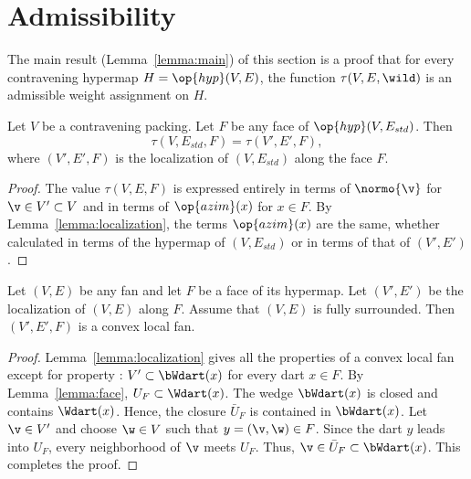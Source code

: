 \section{Admissibility}




The main result (Lemma~\ref{lemma:main}) of this section is a proof
that for every contravening hypermap $H=\op{hyp}(V,E)$, the function
$\tau(V,E,\wild)$ is an admissible weight assignment on $H$.



\begin{lemma}[]\cutrate{}  \label{lemma:tau-local}
  Let $V$ be a contravening packing.
  Let $F$ be any face of $\op{hyp}(V,E_{std})$.  Then
\[ 
\tau(V,E_{std},F) = \tau(V',E',F),
\] 
where $(V',E',F)$ is the localization of $(V,E_{std})$ along the face $F$.
\end{lemma}

\begin{proof} The value $\tau(V,E,F)$ is expressed entirely in terms
  of $\normo{\v}$ for $\v\in V'\subset V$ and in terms of
  $\op{azim}(x)$ for $x\in F$.  By Lemma~\ref{lemma:localization},
  the terms $\op{azim}(x)$ are the same, whether calculated in terms
  of the hypermap of $(V,E_{std})$ or in terms of that of $(V',E')$.
\end{proof}


\begin{lemma}[]\cutrate{} Let $(V,E)$ be any fan and
  let $F$ be a face of its hypermap.  Let $(V',E')$ be the
  localization of $(V,E)$ along $F$.  Assume that $(V,E)$ is fully surrounded.
  Then $(V',E',F)$ is a convex local fan.
\end{lemma}

\begin{proof}
  Lemma~\ref{lemma:localization} gives all the properties of a convex local fan except for property : $V'\subset \bWdart(x)$ for
  every dart $x\in F$.  By Lemma~\ref{lemma:face}, $U_F \subset
  \Wdart(x)$.  The wedge $\bWdart(x)$ is closed and contains
  $\Wdart(x)$. Hence, the closure $\bar U_F$ is contained in
  $\bWdart(x)$.  Let $\v\in V'$ and choose $\w\in V$ such that
  $y=(\v,\w)\in F$.
  Since the dart $y$ leads into $U_F$, every neighborhood of $\v$
  meets $U_F$.  Thus, $\v\in \bar U_F\subset \bWdart(x)$.  This
  completes the proof.
\end{proof}








